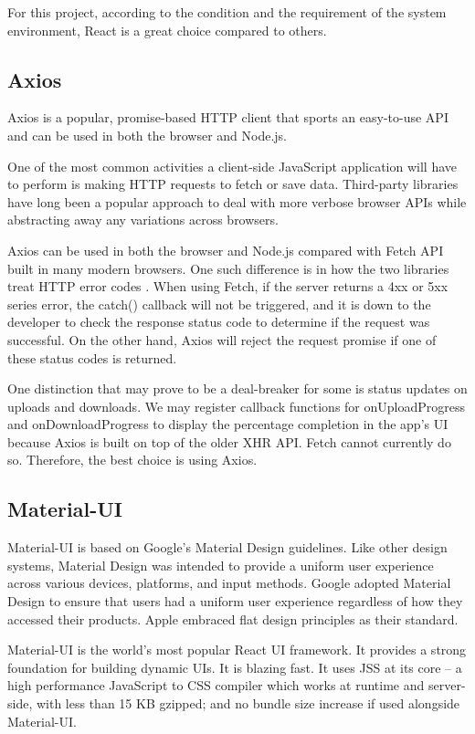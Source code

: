 For this project, according to the condition and the requirement of the system environment, React is a great choice compared to others. 

\subsection{Axios}
Axios is a popular, promise-based HTTP client \cite{axios} that sports an easy-to-use API and can be used in both the browser and Node.js.

One of the most common activities a client-side JavaScript application will have to perform is making HTTP requests to fetch or save data. Third-party libraries have long been a popular approach to deal with more verbose browser APIs while abstracting away any variations across browsers.

Axios can be used in both the browser and Node.js compared with Fetch API built in many modern browsers. One such difference is in how the two libraries treat HTTP error codes \cite{http}. When using Fetch, if the server returns a 4xx or 5xx series error, the catch() callback will not be triggered, and it is down to the developer to check the response status code to determine if the request was successful. On the other hand, Axios will reject the request promise if one of these status codes is returned.

One distinction that may prove to be a deal-breaker for some is status updates on uploads and downloads. We may register callback functions for onUploadProgress and onDownloadProgress to display the percentage completion in the app's UI because Axios is built on top of the older XHR API. Fetch cannot currently do so. Therefore, the best choice is using Axios.

\subsection{Material-UI}
Material-UI is based on Google's Material Design guidelines. Like other design systems, Material Design was intended to provide a uniform user experience across various devices, platforms, and input methods. Google adopted Material Design to ensure that users had a uniform user experience regardless of how they accessed their products. Apple embraced flat design principles as their standard. \cite{material}

Material-UI is the world's most popular React UI framework. It provides a strong foundation for building dynamic UIs. It is blazing fast. It uses JSS at its core – a high performance JavaScript to CSS compiler which works at runtime and server-side, with less than 15 KB gzipped; and no bundle size increase if used alongside Material-UI.

